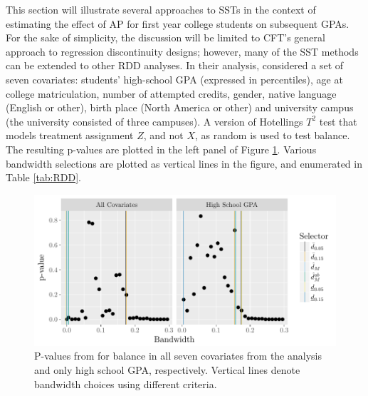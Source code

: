 \documentclass[12pt]{article}\usepackage[]{graphicx}\usepackage[]{color}
\makeatletter
\def\maxwidth{ %
  \ifdim\Gin@nat@width>\linewidth
    \linewidth
  \else
    \Gin@nat@width
  \fi
}
\newenvironment{knitrout}{}{} %
\makeatother
\begin{document}
This section will illustrate several approaches to SSTs in the context
of estimating the effect of AP for first year college students on
subsequent GPAs.
For the sake of simplicity, the discussion will be limited to CFT's
general approach to regression discontinuity designs; however, many of
the SST methods can be extended to other RDD analyses.
In their analysis, \citet{lso}  considered a set of seven covariates:
students' high-school GPA (expressed in percentiles), age at college
matriculation, number of attempted credits, gender, native language
(English or other), birth place (North America or other) and
university campus (the university consisted of three campuses).
A version of Hotellings $T^2$ test that models
treatment assignment $Z$, and not $X$, as random \citep{hansenBowers}
is used to test balance.
The resulting p-values are plotted in the left panel of Figure \ref{fig:rdpvalues1}.
Various bandwidth selections are plotted as vertical lines in the
figure, and enumerated in Table \ref{tab:RDD}.

\begin{figure}
\begin{knitrout}
\color{fgcolor}
\includegraphics[width=\maxwidth]{figure/rdd-1} 

\end{knitrout}
\caption{P-values from for balance in all seven covariates
  from the \citet{lso} analysis and only high school GPA, respectively. Vertical lines denote bandwidth choices using
  different criteria.}
\label{fig:rdpvalues1}
\end{figure}
\end{document}
